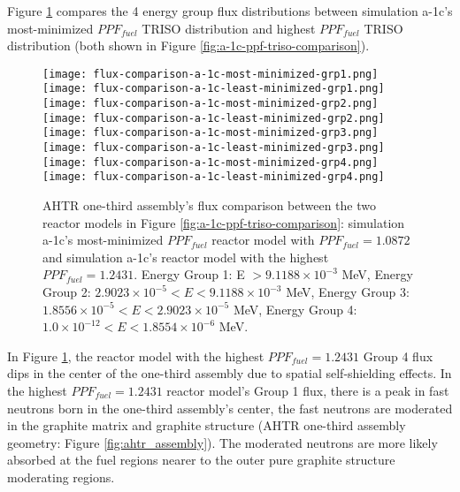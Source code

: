 Figure \ref{fig:a-1c-flux-comparison} compares the 4 energy group flux distributions 
between simulation a-1c's most-minimized $PPF_{fuel}$ TRISO distribution and highest 
$PPF_{fuel}$ TRISO distribution (both shown in Figure \ref{fig:a-1c-ppf-triso-comparison}). 
\begin{figure}[htbp!]
    \centering
    \texttt{[image: flux-comparison-a-1c-most-minimized-grp1.png]} 
    \texttt{[image: flux-comparison-a-1c-least-minimized-grp1.png]} 
    \texttt{[image: flux-comparison-a-1c-most-minimized-grp2.png]} 
    \texttt{[image: flux-comparison-a-1c-least-minimized-grp2.png]} 
    \texttt{[image: flux-comparison-a-1c-most-minimized-grp3.png]} 
    \texttt{[image: flux-comparison-a-1c-least-minimized-grp3.png]} 
    \texttt{[image: flux-comparison-a-1c-most-minimized-grp4.png]} 
    \texttt{[image: flux-comparison-a-1c-least-minimized-grp4.png]} 
    \caption{AHTR one-third assembly's flux comparison between the two reactor models 
    in Figure \ref{fig:a-1c-ppf-triso-comparison}: simulation a-1c's most-minimized 
    $PPF_{fuel}$ reactor model with $PPF_{fuel} = 1.0872$ and simulation a-1c's reactor 
    model with the highest $PPF_{fuel} = 1.2431$.
    Energy Group 1: E $> 9.1188 \times 10^{-3}$ MeV, 
    Energy Group 2: $2.9023 \times 10^{-5} < E < 9.1188 \times 10^{-3}$ MeV,
    Energy Group 3:  $1.8556 \times 10^{-5} < E < 2.9023 \times 10^{-5}$ MeV,
    Energy Group 4:  $1.0 \times 10^{-12} < E < 1.8554 \times 10^{-6}$ MeV.}
    \label{fig:a-1c-flux-comparison}
\end{figure}

In Figure \ref{fig:a-1c-flux-comparison}, the reactor model with the highest 
$PPF_{fuel} = 1.2431$ Group 4 flux dips in the center of the one-third assembly 
due to spatial self-shielding effects. 
In the highest $PPF_{fuel} = 1.2431$ reactor model's Group 1 flux, there is a peak in 
fast neutrons born in the one-third assembly's center, the fast neutrons are moderated 
in the graphite matrix and graphite structure (\gls{AHTR} one-third assembly 
geometry: Figure \ref{fig:ahtr_assembly}). 
The moderated neutrons are more likely absorbed at the fuel regions nearer to 
the outer pure graphite structure moderating regions. 


